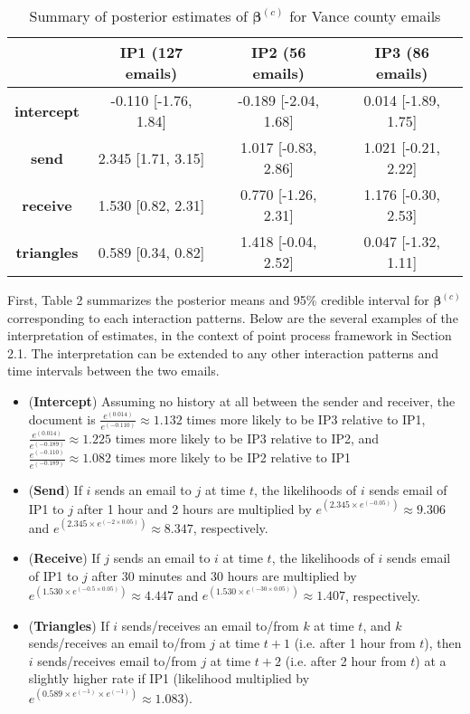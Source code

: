 \documentclass[a4paper]{article}
\begin{document}
\begin{table}[ht]
	\centering
	\begin{tabular}{|c|c|c|c|} 
		\hline
		& \textbf{IP1} (127 emails) & \textbf{IP2} (56 emails) &\textbf{IP3} (86 emails) \\
		\hline
		\textbf{intercept} &-0.110 [-1.76, 1.84]& -0.189 [-2.04, 1.68]& 0.014 [-1.89, 1.75]\\
		\textbf{send}&  2.345 [1.71, 3.15]& 1.017 [-0.83, 2.86]& 1.021 [-0.21, 2.22]\\
		\textbf{receive}& 1.530 [0.82, 2.31]& 0.770 [-1.26, 2.31]& 1.176 [-0.30, 2.53]\\
		\textbf{triangles} & 0.589 [0.34, 0.82]& 1.418 [-0.04, 2.52]& 0.047 [-1.32, 1.11]\\
			\hline
	\end{tabular}
	\caption {Summary of posterior estimates of $\boldsymbol{\beta}^{(c)}$ for Vance county emails}
	\label{table:Vancebeta}
\end{table}
\newline
\normalsize First, Table 2 summarizes the posterior means and 95\% credible interval for $\boldsymbol{\beta}^{(c)}$ corresponding to each interaction patterns. Below are the several examples of the interpretation of estimates, in the context of point process framework in Section 2.1. The interpretation can be extended to any other interaction patterns and time intervals between the two emails.
\begin{itemize} 
	\item (\textbf{Intercept}) Assuming no history at all between the sender and receiver, the document is $\frac{e^{(0.014)}}{e^{(-0.110)}}\approx 1.132$ times more likely to be IP3 relative to IP1, $\frac{e^{(0.014)}}{e^{(-0.189)}}\approx 1.225$ times more likely to be IP3 relative to IP2, and $\frac{e^{(-0.110)}}{e^{(-0.189)}}\approx 1.082$ times more likely to be IP2 relative to IP1
	\item (\textbf{Send}) If $i$ sends an email to $j$ at time $t$, the likelihoods of $i$ sends email of IP1 to $j$ after 1 hour and 2 hours are multiplied by $e^{(2.345\times e^{(-0.05)})}\approx 9.306$ and $e^{(2.345\times e^{(-2\times 0.05)})}\approx 8.347$, respectively.
\item (\textbf{Receive}) If $j$ sends an email to $i$ at time $t$, the likelihoods of $i$ sends email of IP1 to $j$ after 30 minutes and 30 hours are multiplied by $e^{(1.530\times e^{(-0.5\times 0.05)})}\approx 4.447$ and $e^{(1.530\times e^{(-30\times 0.05)})}\approx 1.407$, respectively.
	\item (\textbf{Triangles}) If $i$ sends/receives an email to/from $k$ at time $t$, and $k$ sends/receives an email to/from $j$ at time $t+1$ (i.e. after 1 hour from $t$), then $i$ sends/receives email to/from $j$ at time $t+2$ (i.e. after 2 hour from $t$) at a slightly higher rate if IP1 (likelihood multiplied by $e^{(0.589\times e^{(-1)}\times e^{(-1)})}\approx 1.083$).
\end{itemize}
\end{document}

